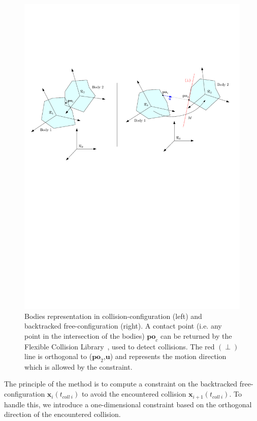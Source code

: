 \documentclass{tADR2e}
\newcommand\xx{\mathbf{x}}
\newcommand\tcolli{t_{coll\ i}}
\newcommand\po{\mathbf{po}}
\begin{document}
\begin{figure}[b]
	\centering
	\includegraphics[width=15cm]{contact-points.pdf}
	\caption{Bodies representation in collision-configuration (left) and 
	backtracked free-configuration (right). A contact point (i.e. any point in 
	the intersection of the bodies) $\po_c$ can be returned by the Flexible 
	Collision Library~\cite{fcl}, used to detect collisions. The red $(\perp)$ 
	line is orthogonal to ($\po_2$,$\mathbf{u}$) and represents the motion 
	direction which is allowed by the constraint.}
	\label{contact-points}
\end{figure}

The principle of the method is to compute a constraint on the backtracked free-
configuration $\xx_{i}(\tcolli)$ to avoid the encountered collision $\xx_{i+1}
(\tcolli)$. To handle this, we introduce a one-dimensional constraint based on the 
orthogonal direction of the encountered collision.
\end{document}
